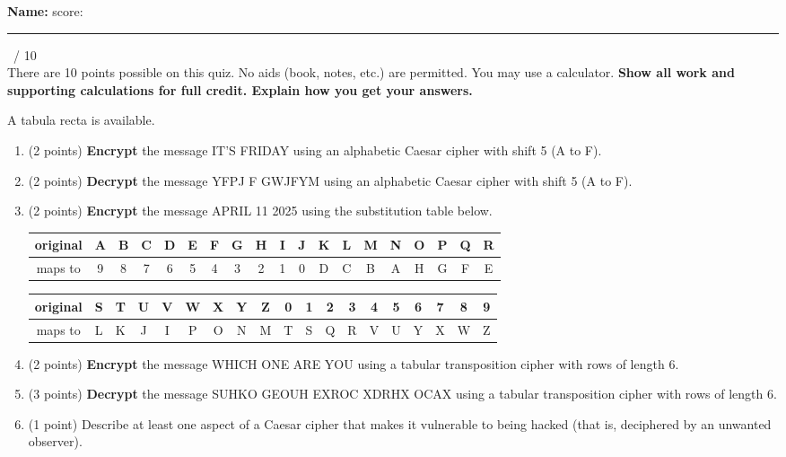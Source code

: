 \documentclass[12pt]{article}
\def\be{\begin{enumerate}}
\def\ee{\end{enumerate}}
\newcommand{\ans}[1][1in]{\rule{#1}{.5pt}}
\begin{document}
\vspace{1cm}
\strut

\noindent \textbf{Name:} \hrulefill \quad  score:\ans[1cm] \ / 10 \\


\noindent There are 10 points possible on this quiz. No aids (book, notes, etc.)
are permitted. You may use a calculator.  {\bf Show all work and supporting calculations for full credit. Explain how you get your answers.}

A tabula recta is available.


\be

\item (2 points)  \textbf{Encrypt} the message IT'S FRIDAY using an alphabetic Caesar cipher with shift 5 (A to F).

\vfill

\item (2 points)  \textbf{Decrypt} the message YFPJ F GWJFYM using an alphabetic Caesar cipher with shift 5 (A to F).

\vfill

\item (2 points)  \textbf{Encrypt} the message APRIL 11 2025 using the substitution table below.\\

{\scriptsize
\begin{tabular}{|c|c|c|c|c|c|c|c|c|c|c|c|c|c|c|c|c|c|c|}
\hline
original& A&B&C&D&E&F&G&H&I&J&K&L&M&N&O&P&Q&R\\  \hline
maps to&9&8&7&6&5&4&3&2&1&0&D&C&B&A&H&G&F&E\\
\hline
\end{tabular}

\begin{tabular}{|c|c|c|c|c|c|c|c|c|c|c|c|c|c|c|c|c|c|c|}
 \hline
original &S&T&U&V&W&X&Y&Z&0&1&2&3&4&5&6&7&8&9\\ \hline
maps to&L&K&J&I&P&O&N&M&T&S&Q&R&V&U&Y&X&W&Z \\
\hline
\end{tabular}
}

\vfill
\newpage
\item (2 points)  \textbf{Encrypt} the message WHICH ONE ARE YOU using a tabular transposition cipher with rows of length 6.

\vfill

\item (3 points)   \textbf{Decrypt} the message SUHKO GEOUH EXROC XDRHX OCAX using a tabular transposition cipher with rows of length 6.

\vfill
\item (1 point)  Describe at least one aspect of a Caesar cipher that makes it vulnerable to being hacked (that is, deciphered by an unwanted observer).
\vfill

\ee
\end{document}
